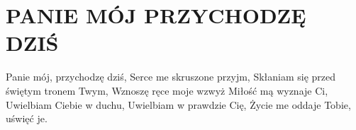 \documentclass[../../../songbook.tex]{subfiles}
\begin{document}
\TabPositions{8cm} %
\section*{PANIE MÓJ PRZYCHODZĘ DZIŚ}
{}
\vspace{0.5cm}

Panie mój, przychodzę dziś,	 \newline
Serce me skruszone przyjm,	 \newline
Skłaniam się przed 			 \newline
świętym tronem Twym,		 \newline
Wznoszę ręce moje wzwyż 	 \newline
Miłość mą wyznaje Ci,		 \newline
Uwielbiam Ciebie w duchu,	 \newline
Uwielbiam w prawdzie Cię,	 \newline
Życie me oddaje Tobie, 		 \newline
uświęć je.					 \newline
\end{document}
